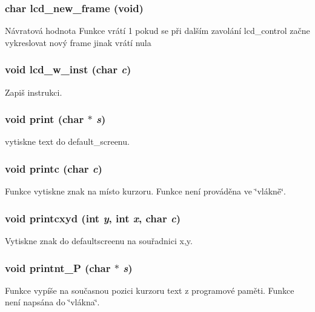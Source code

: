 \subsubsection[{lcd\_\-new\_\-frame}]{\setlength{\rightskip}{0pt plus 5cm}char lcd\_\-new\_\-frame (void)}\label{lcd_8c_a2fdcaa04d2a5ef5f829a2c0503b95009}
\begin{DoxyReturn}{Návratová hodnota}
Funkce vrátí 1 pokud se při dalším zavolání lcd\_\-control začne vykreslovat nový frame jinak vrátí nula 
\end{DoxyReturn}
\subsubsection[{lcd\_\-w\_\-inst}]{\setlength{\rightskip}{0pt plus 5cm}void lcd\_\-w\_\-inst (char {\em c})}\label{lcd_8c_a98e19b75c7263dd914e04a630f43cde1}


Zapiš instrukci. 
\subsubsection[{print}]{\setlength{\rightskip}{0pt plus 5cm}void print (char $\ast$ {\em s})}\label{lcd_8c_a51283220f829206d8ef3284047a58fbd}


vytiskne text do default\_\-screenu. 
\subsubsection[{printc}]{\setlength{\rightskip}{0pt plus 5cm}void printc (char {\em c})}\label{lcd_8c_a7ead26e52916805b53cb705997cb90bb}
Funkce vytiskne znak na místo kurzoru. Funkce není prováděna ve \char`\"{}vlákně\char`\"{}. 
\subsubsection[{printcxyd}]{\setlength{\rightskip}{0pt plus 5cm}void printcxyd (int {\em y}, \/  int {\em x}, \/  char {\em c})}\label{lcd_8c_ab0348002a81c8fe945f405d57b317db1}


Vytiskne znak do defaultscreenu na souřadnici x,y. 
\subsubsection[{printnt\_\-P}]{\setlength{\rightskip}{0pt plus 5cm}void printnt\_\-P (char $\ast$ {\em s})}\label{lcd_8c_aa4fa8c7956bc27eae6a818d41199691f}
Funkce vypíše na současnou pozici kurzoru text z programové paměti. Funkce není napsána do \char`\"{}vlákna\char`\"{}. 
